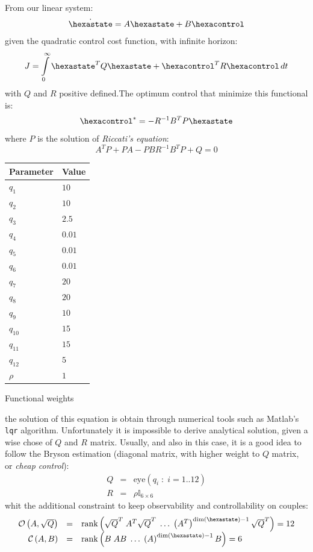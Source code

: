 From our linear system:
\begin{equation}
\dot{\hexastate} = A \hexastate + B \hexacontrol
\end{equation}
given the quadratic control cost function, with infinite horizon:
\[
J = \int\limits_{0}^{\infty} \hexastate^T Q \hexastate + \hexacontrol^T R \hexacontrol\, dt
\]
with $Q$ and $R$ positive defined.The optimum control that minimize this functional is: 
\begin{equation}
\hexacontrol^* = - R^{-1} B^T P \hexastate
\end{equation}
where $P$ is the solution of \emph{Riccati's equation}:
\[
A^T P + PA - P B R^{-1} B^T P + Q = 0
\]
\begin{margintable}
\renewcommand{\arraystretch}{1}
	\begin{centering}
	\begin{tabular}{p{1.5cm} p{1.5cm}}
		\hline
		\textbf{Parameter} & \textbf{Value} \\
		\hline
		$q_1$    & $10$ \\
		$q_2$    & $10$ \\
		$q_3$    & $2.5$ \\
		$q_4$    & $0.01$ \\
		$q_5$    & $0.01$ \\
		$q_6$    & $0.01$ \\
		$q_7$    & $20$ \\
		$q_8$    & $20$ \\
		$q_9$    & $10$ \\
		$q_{10}$ & $15$ \\
		$q_{11}$ & $15$ \\
		$q_{12}$ & $5$ \\
		$\rho$   & $1$ \\ \hline
	\end{tabular}
	\end{centering}
	\caption{Functional weights}
\renewcommand{\arraystretch}{1.75}	
\end{margintable}
the solution of this equation is obtain through numerical tools such as Matlab's \texttt{lqr} algorithm. Unfortunately it is impossible to derive analytical solution, given a wise chose of $Q$ and $R$ matrix. Usually, and also in this case, it is a good idea to follow the Bryson estimation (diagonal matrix, with higher weight to $Q$ matrix, or \emph{cheap control}):
\[
\begin{array}{rcl}
Q & = & \mathrm{eye}\left( q_i \; : \; i = 1..12 \right) \\
R & = & \rho \mathbb{I}_{6\times 6}
\end{array}
\]
whit the additional constraint to keep observability and controllability on couples:
\[
\begin{array}{rcl}
\mathcal{O}\braces{A,\sqrt{Q}} & = & \mathrm{rank}\braces{ \sqrt{Q}^T\;A^T\sqrt{Q}^T\;\dots\;\braces{A^T}^{\dim(\hexastate)-1}\sqrt{Q}^T} = 12 \\
\mathcal{C}\braces{A,B} & = & \mathrm{rank}\braces{ B\;A B\;\dots\;\braces{A}^{\dim(\hexastate)-1}B} = 6
\end{array}
\]


